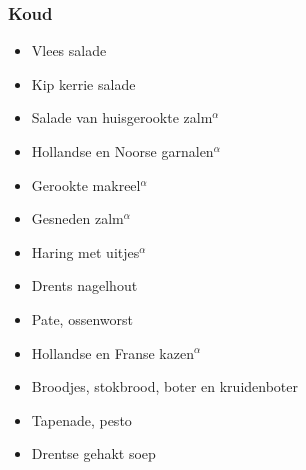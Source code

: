 \subsubsection*{Koud}
\begin{itemize}
	\item	Vlees salade
	\item	Kip kerrie salade
	\item	Salade van huisgerookte zalm$^{\alpha}$
	\item	Hollandse en Noorse garnalen$^{\alpha}$
	\item	Gerookte makreel$^{\alpha}$
	\item	Gesneden zalm$^{\alpha}$
	\item	Haring met uitjes$^{\alpha}$
	\item	Drents nagelhout
	\item	Pate, ossenworst
	\item	Hollandse en Franse kazen$^{\alpha}$
	\item	Broodjes, stokbrood, boter en kruidenboter
	\item	Tapenade, pesto
	\item	Drentse gehakt soep
\end{itemize}
